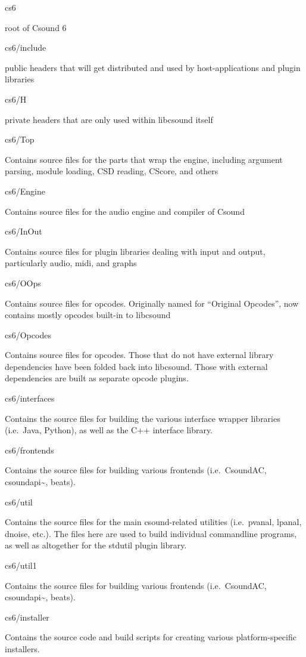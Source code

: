 cs6

root of Csound 6

cs6/include

public headers that will get distributed and used by host-applications
and plugin libraries

cs6/H

private headers that are only used within libcsound itself

cs6/Top

Contains source files for the parts that wrap the engine, including
argument parsing, module loading, CSD reading, CScore, and others

cs6/Engine

Contains source files for the audio engine and compiler of Csound

cs6/InOut

Contains source files for plugin libraries dealing with input and
output, particularly audio, midi, and graphs

cs6/OOps

Contains source files for opcodes. Originally named for ``Original
Opcodes'', now contains mostly opcodes built-in to libcsound

cs6/Opcodes

Contains source files for opcodes. Those that do not have external
library dependencies have been folded back into libcsound. Those with
external dependencies are built as separate opcode plugins.

cs6/interfaces

Contains the source files for building the various interface wrapper
libraries (i.e.~Java, Python), as well as the C++ interface library.

cs6/frontends

Contains the source files for building various frontends (i.e.~CsoundAC,
csoundapi\textasciitilde{}, beats).

cs6/util

Contains the source files for the main csound-related utilities
(i.e.~pvanal, lpanal, dnoise, etc.). The files here are used to build
individual commandline programs, as well as altogether for the stdutil
plugin library.

cs6/util1

Contains the source files for building various frontends (i.e.~CsoundAC,
csoundapi\textasciitilde{}, beats).

cs6/installer

Contains the source code and build scripts for creating various
platform-specific installers.

